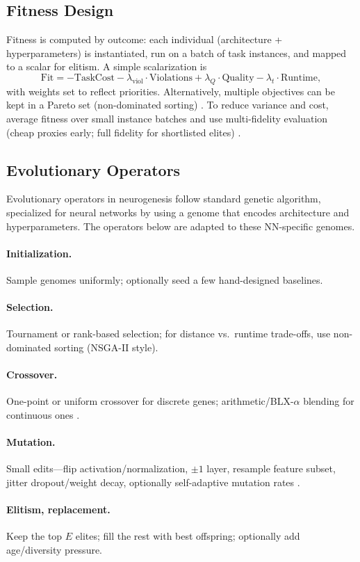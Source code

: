 \subsection{Fitness Design}

Fitness is computed by outcome: each individual (architecture + hyperparameters) is instantiated, run on a batch of task instances, and mapped to a scalar for elitism. A simple scalarization is
\[
\text{Fit} = -\text{TaskCost} - \lambda_{\text{viol}} \cdot \text{Violations} + \lambda_Q \cdot \text{Quality} - \lambda_t \cdot \text{Runtime},
\]
with weights set to reflect priorities. Alternatively, multiple objectives can be kept in a Pareto set (non-dominated sorting) \cite{EMH19}. To reduce variance and cost, average fitness over small instance batches and use multi-fidelity evaluation (cheap proxies early; full fidelity for shortlisted elites) \cite{WSS+23}.

\subsection{Evolutionary Operators}

Evolutionary operators in neurogenesis follow standard genetic algorithm, specialized for neural networks by using a genome that encodes architecture and hyperparameters. The operators below are adapted to these NN-specific genomes.

\paragraph{Initialization.}
Sample genomes uniformly; optionally seed a few hand-designed baselines.

\paragraph{Selection.}
Tournament or rank-based selection; for distance vs.\ runtime trade-offs, use non-dominated sorting (NSGA-II style).

\paragraph{Crossover.}
One-point or uniform crossover for discrete genes; arithmetic/BLX-$\alpha$ blending for continuous ones \cite{TK01}.

\paragraph{Mutation.}
Small edits---flip activation/normalization, $\pm 1$ layer, resample feature subset, jitter dropout/weight decay, optionally self-adaptive mutation rates \cite{LSX+20}.

\paragraph{Elitism, replacement.}
Keep the top $E$ elites; fill the rest with best offspring; optionally add age/diversity pressure.
